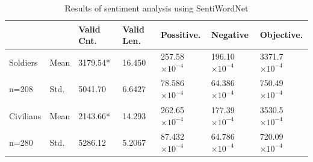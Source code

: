 \begin{table}[h]
  \caption{Results of sentiment analysis using SentiWordNet}
  \label{table:sentiResult}
  \centering
  \renewcommand{\tabularxcolumn}{m} %
  \begin{tabularx}{\textwidth}{l l | l l l l l}
    \toprule
              &      & \textbf{Valid Cnt.} & \textbf{Valid Len.} & \textbf{Possitive.}    & \textbf{Negative}      & \textbf{Objective.}
    \tabularnewline \midrule
    Soldiers  & Mean & 3179.54*            & 16.450              & 257.58$\times 10^{-4}$ & 196.10$\times 10^{-4}$ & 3371.7$\times 10^{-4}$
    \tabularnewline
    n=208     & Std. & 5041.70             & 6.6427              & 78.586$\times 10^{-4}$ & 64.386$\times 10^{-4}$ & 750.49$\times 10^{-4}$
    \tabularnewline \hline \hline
    Civilians & Mean & 2143.66*            & 14.293              & 262.65$\times 10^{-4}$ & 177.39$\times 10^{-4}$ & 3530.5$\times 10^{-4}$
    \tabularnewline
    n=280     & Std. & 5286.12             & 5.2067              & 87.432$\times 10^{-4}$ & 64.786$\times 10^{-4}$ & 720.09$\times 10^{-4}$
    \tabularnewline \bottomrule
  \end{tabularx}
\end{table}


